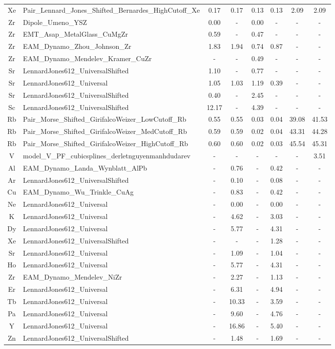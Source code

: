 \documentclass[%
 reprint,
 amsmath,amssymb,
 aps,
]{revtex4-1}
\begin{document}
\begin{longtable*}{@{\extracolsep{\fill}} c l c c c c c c}
 Xe & Pair\_Lennard\_Jones\_Shifted\_Bernardes\_HighCutoff\_Xe & 0.17 & 0.17 & 0.13 & 0.13 & 2.09 & 2.09 \\
 Zr & Dipole\_Umeno\_YSZ & 0.00 & - & 0.00 & - & - & - \\
 Zr & EMT\_Asap\_MetalGlass\_CuMgZr & 0.59 & - & 0.47 & - & - & - \\
 Zr & EAM\_Dynamo\_Zhou\_Johnson\_Zr & 1.83 & 1.94 & 0.74 & 0.87 & - & - \\
 Zr & EAM\_Dynamo\_Mendelev\_Kramer\_CuZr & - & - & 0.49 & - & - & - \\
 Sr & LennardJones612\_UniversalShifted & 1.10 & - & 0.77 & - & - & - \\
 Sr & LennardJones612\_Universal & 1.05 & 1.03 & 1.19 & 0.39 & - & - \\
 Sr & LennardJones612\_UniversalShifted & 0.40 & - & 2.45 & - & - & - \\
 Sc & LennardJones612\_UniversalShifted & 12.17 & - & 4.39 & - & - & - \\
 Rb & Pair\_Morse\_Shifted\_GirifalcoWeizer\_LowCutoff\_Rb & 0.55 & 0.55 & 0.03 & 0.04 & 39.08 & 41.53 \\
 Rb & Pair\_Morse\_Shifted\_GirifalcoWeizer\_MedCutoff\_Rb & 0.59 & 0.59 & 0.02 & 0.04 & 43.31 & 44.28 \\
 Rb & Pair\_Morse\_Shifted\_GirifalcoWeizer\_HighCutoff\_Rb & 0.60 & 0.60 & 0.02 & 0.03 & 45.54 & 45.31 \\
 V & model\_V\_PF\_cubicsplines\_derletnguyenmanhdudarev & - & - & - & - & - & 3.51 \\
 Al & EAM\_Dynamo\_Landa\_Wynblatt\_AlPb & - & 0.76 & - & 0.42 & - & - \\
 Ar & LennardJones612\_UniversalShifted & - & 0.10 & - & 0.08 & - & - \\
 Cu & EAM\_Dynamo\_Wu\_Trinkle\_CuAg & - & 0.83 & - & 0.42 & - & - \\
 Ne & LennardJones612\_Universal & - & 0.00 & - & 0.00 & - & - \\
 K & LennardJones612\_Universal & - & 4.62 & - & 3.03 & - & - \\
 Dy & LennardJones612\_Universal & - & 5.77 & - & 4.31 & - & - \\
 Xe & LennardJones612\_UniversalShifted & - & - & - & 1.28 & - & - \\
 Sr & LennardJones612\_Universal & - & 1.09 & - & 1.04 & - & - \\
 Ho & LennardJones612\_Universal & - & 5.77 & - & 4.31 & - & - \\
 Zr & EAM\_Dynamo\_Mendelev\_NiZr & - & 2.27 & - & 1.13 & - & - \\
 Er & LennardJones612\_Universal & - & 6.31 & - & 4.94 & - & - \\
 Tb & LennardJones612\_Universal & - & 10.33 & - & 3.59 & - & - \\
 Pa & LennardJones612\_Universal & - & 9.60 & - & 4.76 & - & - \\
 Y & LennardJones612\_Universal & - & 16.86 & - & 5.40 & - & - \\
 Zn & LennardJones612\_UniversalShifted & - & 1.48 & - & 1.69 & - & - \\
\end{longtable*}
\end{document}
